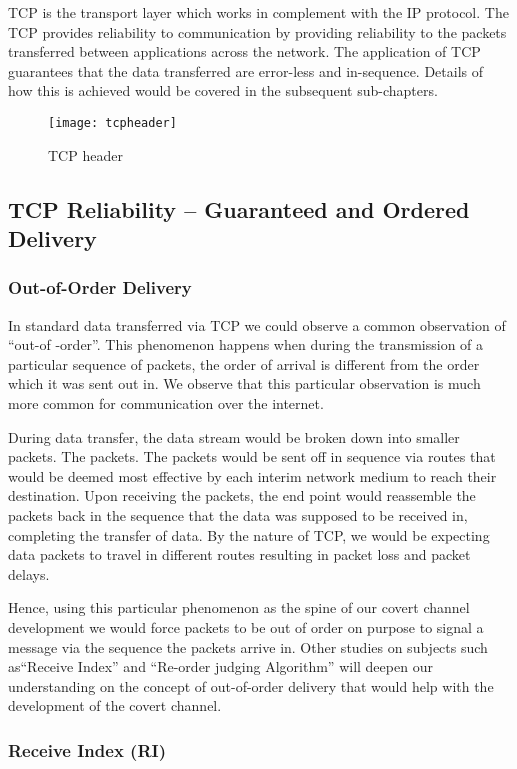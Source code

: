 \documentclass[letterpaper,twocolumn,10pt]{article}
\begin{document}
TCP is the transport layer which works in complement with the IP protocol. The TCP provides reliability to communication by providing reliability to the packets transferred between applications across the network\cite{rfceditor}. The application of TCP guarantees that the data transferred are error-less and in-sequence. Details of how this is achieved would be covered in the subsequent sub-chapters.

\begin{figure}[htp]
    \centering
    \texttt{[image: tcpheader]}
    \caption{TCP header}
\end{figure}

\subsection{TCP Reliability – Guaranteed and Ordered Delivery}

\subsubsection{Out-of-Order Delivery}
In standard data transferred via TCP we could observe a common observation of “out-of -order”. This phenomenon happens when during the transmission of a particular sequence of packets, the order of arrival is different from the order which it was sent out in. We observe that this particular observation is much more common for communication over the internet.

During data transfer, the data stream would be broken down into smaller packets. The packets. The packets would be sent off in sequence via routes that would be deemed most effective by each interim network medium to reach their destination. Upon receiving the packets, the end point would reassemble the packets back in the sequence that the data was supposed to be received in, completing the transfer of data. By the nature of TCP, we would be expecting data packets to travel in different routes resulting in packet loss and packet delays.

Hence, using this particular phenomenon as the spine of our covert channel development we would force packets to be out of order on purpose to signal a message via the sequence the packets arrive in. Other studies on subjects such as“Receive Index” and “Re-order judging Algorithm” will deepen our understanding on the concept of out-of-order delivery that would help with the development of the covert channel.

\subsubsection{Receive Index (RI)}
\end{document}
